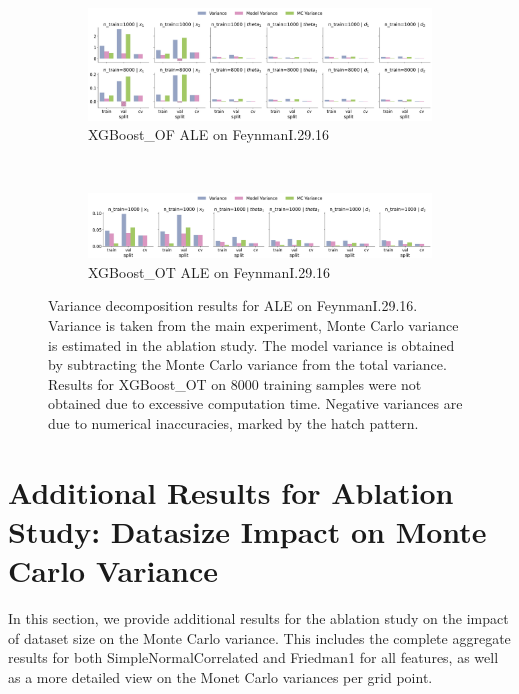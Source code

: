 \documentclass[runningheads]{llncs}
\begin{document}
\begin{figure}[ht!]
    \centering
    \begin{subfigure}[b]{0.9\textwidth}
        \includegraphics[width=\textwidth]{img/FeynmanI.29.16-all/variance_decomposition_ale_XGBoost_OF.png}
        \caption{XGBoost\_OF ALE on FeynmanI.29.16}
    \end{subfigure}
    \\[10pt]
    \vfill
    \begin{subfigure}[b]{0.9\textwidth}
        \includegraphics[width=\textwidth]{img/FeynmanI.29.16-all/variance_decomposition_ale_XGBoost_OT.png}
        \caption{XGBoost\_OT ALE on FeynmanI.29.16}
    \end{subfigure}
    \caption{Variance decomposition results for ALE on FeynmanI.29.16. Variance is taken from the
        main experiment, Monte Carlo variance is estimated in the ablation study. The model variance is
        obtained by subtracting the Monte Carlo variance from the total variance. Results for XGBoost\_OT
        on 8000 training samples were not obtained due to excessive computation time. Negative variances are
        due to numerical inaccuracies, marked by the hatch pattern.}
    \label{fig:ale-variance-decomp-feynman}  %
\end{figure}

\clearpage
\section{Additional Results for Ablation Study: Datasize Impact on Monte Carlo Variance}\label{app:additional-mc-results}

In this section, we provide additional results for the ablation study on the impact of dataset size
on the Monte Carlo variance. This includes the complete aggregate results for both SimpleNormalCorrelated and
Friedman1 for all features, as well as a more detailed view on the Monet Carlo variances per grid point.
\end{document}
